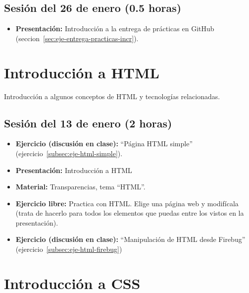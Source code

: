 \documentclass[a4paper,12pt]{report}
\begin{document}
\subsection{Sesión del 26 de enero (0.5 horas)}

\begin{itemize}
\item \textbf{Presentación:} Introducción a la entrega de prácticas en GitHub (seccion~\ref{sec:eje-entrega-practicas-incr}).
\end{itemize}

\section{Introducción a HTML}

Introducción a algunos conceptos de HTML y tecnologías relacionadas.

\subsection{Sesión del 13 de enero (2 horas)}

\begin{itemize}
\item \textbf{Ejercicio (discusión en clase):} ``Página HTML simple'' (ejercicio~\ref{subsec:eje-html-simple}).
\item \textbf{Presentación:} Introducción a HTML
\item \textbf{Material:} Transparencias, tema ``HTML''.
\item \textbf{Ejercicio libre:} Practica con HTML. Elige una página web y modifícala (trata de hacerlo para todos los elementos que puedas entre los vistos en la presentación).
\item \textbf{Ejercicio (discusión en clase):} ``Manipulación de HTML desde Firebug'' (ejercicio~\ref{subsec:eje-html-firebug})
\end{itemize}

\section{Introducción a CSS}
\end{document}

